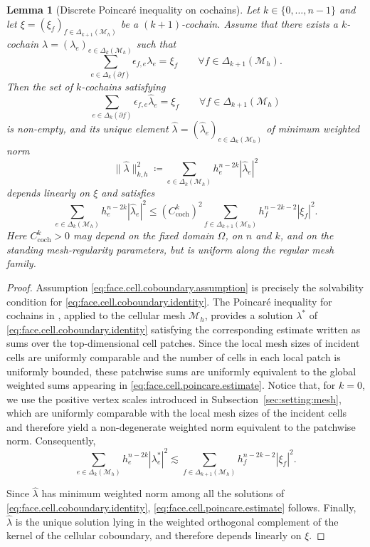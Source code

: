 \documentclass[a4paper,11pt]{article}
\newtheorem{lemma}[theorem]{Lemma}
\theoremstyle{definition}
\newcommand{\Mh}{\mathcal{M}_h}
\newcommand{\FM}[1]{\Delta_{#1}}
\begin{document}
\begin{lemma}[Discrete Poincar\'e inequality on cochains]
\label{lem:cochain.poincare}
Let $k\in\{0,\ldots,n-1\}$ and let $\xi=(\xi_f)_{f\in\FM{k+1}(\Mh)}$ be a $(k+1)$-cochain.
Assume that there exists a $k$-cochain $\lambda=(\lambda_e)_{e\in\FM{k}(\Mh)}$ such that
\begin{equation}\label{eq:face.cell.coboundary.assumption}
  \sum_{e\in\FM{k}(\partial f)}\epsilon_{f,e}\lambda_e=\xi_f
  \qquad
  \forall f\in\FM{k+1}(\Mh).
\end{equation}
Then the set of $k$-cochains satisfying
\begin{equation}\label{eq:face.cell.coboundary.identity}
  \sum_{e\in\FM{k}(\partial f)}\epsilon_{f,e}\widehat\lambda_e=\xi_f
  \qquad
  \forall f\in\FM{k+1}(\Mh)
\end{equation}
is non-empty, and its unique element $\widehat\lambda=(\widehat\lambda_e)_{e\in\FM{k}(\Mh)}$ of minimum weighted norm
\[
  \|\widehat\lambda\|_{k,h}^2
  \coloneqq
  \sum_{e\in\FM{k}(\Mh)}h_e^{n-2k}|\widehat\lambda_e|^2
\]
depends linearly on $\xi$ and satisfies
\begin{equation}\label{eq:face.cell.poincare.estimate}
  \sum_{e\in\FM{k}(\Mh)}h_e^{n-2k}|\widehat\lambda_e|^2
  \leq
  (C_{\mathrm{coch}}^k)^2
  \sum_{f\in\FM{k+1}(\Mh)}h_f^{n-2k-2}|\xi_f|^2.
\end{equation}
Here $C_{\mathrm{coch}}^k>0$ may depend on the fixed domain $\Omega$, on $n$ and $k$, and on the standing mesh-regularity parameters, but is uniform along the regular mesh family.
\end{lemma}
\begin{proof}
Assumption \eqref{eq:face.cell.coboundary.assumption} is precisely the solvability condition for \eqref{eq:face.cell.coboundary.identity}.
The Poincar\'e inequality for cochains in \cite[Lemma~6, Eq.~(21)]{Di-Pietro.Droniou.ea:25}, applied to the cellular mesh $\Mh$, provides a solution $\lambda^*$ of \eqref{eq:face.cell.coboundary.identity} satisfying the corresponding estimate written as sums over the top-dimensional cell patches.
Since the local mesh sizes of incident cells are uniformly comparable and the number of cells in each local patch is uniformly bounded, these patchwise sums are uniformly equivalent to the global weighted sums appearing in \eqref{eq:face.cell.poincare.estimate}.
Notice that, for $k=0$, we use the positive vertex scales introduced in Subsection~\ref{sec:setting:mesh}, which are uniformly comparable with the local mesh sizes of the incident cells and therefore yield a non-degenerate weighted norm equivalent to the patchwise norm.
Consequently,
\[
\sum_{e\in\FM{k}(\Mh)}h_e^{n-2k}|\lambda^*_e|^2
\lesssim
\sum_{f\in\FM{k+1}(\Mh)}h_f^{n-2k-2}|\xi_f|^2.
\]

Since $\widehat\lambda$ has minimum weighted norm among all the solutions of \eqref{eq:face.cell.coboundary.identity}, \eqref{eq:face.cell.poincare.estimate} follows.
Finally, $\widehat\lambda$ is the unique solution lying in the weighted orthogonal complement of the kernel of the cellular coboundary, and therefore depends linearly on $\xi$.
\end{proof}
\end{document}
